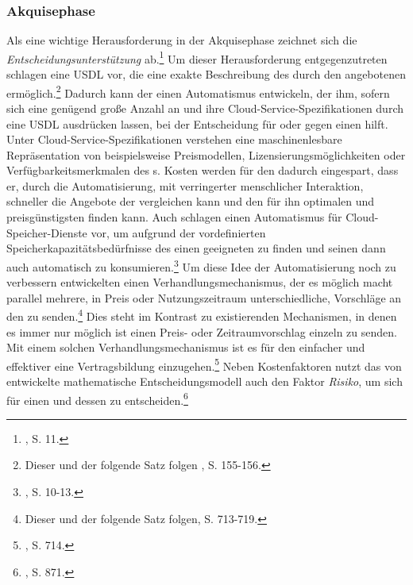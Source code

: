\subsubsection{Akquisephase}
\label{sec:Lösung:Akquisephase}
Als eine wichtige Herausforderung in der Akquisephase zeichnet sich die \emph{Entscheidungsunterstützung} ab.\footnote{\cite{Schneider.2013}, S. 11.}
Um dieser Herausforderung entgegenzutreten schlagen \cite{Oberle.2013} eine \acf{USDL} vor, die eine exakte Beschreibung des durch den \CSP angebotenen \CS ermöglich.\footnote{Dieser und der folgende Satz folgen \cite{Oberle.2013}, S. 155-156.}
Dadurch kann der \CSU einen Automatismus entwickeln, der ihm, sofern sich eine genügend große Anzahl an \CSPn und ihre Cloud-Service-Spezifikationen durch eine \acs{USDL} ausdrücken lassen, bei der Entscheidung für oder gegen einen \CSP hilft.
Unter Cloud-Service-Spezifikationen verstehen \cite{Oberle.2013} eine maschinenlesbare Repräsentation von beispielsweise Preismodellen, Lizensierungsmöglichkeiten oder Verfügbarkeitsmerkmalen des \Cs s.
Kosten werden für den \CSU dadurch eingespart, dass er, durch die Automatisierung, mit verringerter menschlicher Interaktion, schneller die Angebote der \CSP vergleichen kann und den für ihn optimalen und preisgünstigsten \CSP finden kann.
\newline
Auch \cite{Joshi.2012} schlagen einen Automatismus für Cloud-Speicher-\linebreak Dienste vor, um aufgrund der vordefinierten Speicherkapazitätsbedürfnisse des \CSUs einen geeigneten \CSP zu finden und seinen \CS dann auch automatisch zu konsumieren.\footnote{\cite{Joshi.2012}, S. 10-13.}
\newline
Um diese Idee der Automatisierung noch zu verbessern entwickelten \cite{Son.2012} einen Verhandlungsmechanismus, der es möglich macht parallel mehrere, in Preis oder Nutzungszeitraum unterschiedliche, Vorschläge an den \CSP zu senden.\footnote{Dieser und der folgende Satz folgen\cite{Son.2012}, S. 713-719.}
Dies steht im Kontrast zu existierenden Mechanismen, in denen es immer nur möglich ist einen Preis- oder Zeitraumvorschlag einzeln zu senden.
Mit einem solchen Verhandlungsmechanismus ist es für den \CSU einfacher und effektiver eine Vertragsbildung einzugehen.\footnote{\cite{Son.2012}, S. 714.}
\newline
Neben Kostenfaktoren nutzt das von \cite{Martens.2012} entwickelte mathematische Entscheidungsmodell auch den Faktor \emph{Risiko}, um sich für einen \CSP und dessen \CS zu entscheiden.\footnote{\cite{Martens.2012}, S. 871.}
